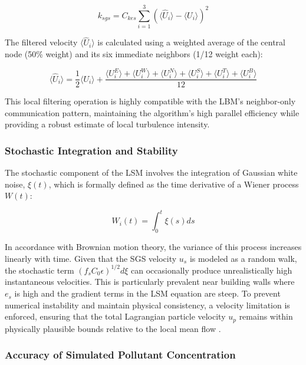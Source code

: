 \begin{equation}
    k_{sgs} = C_{kes} \sum_{i=1}^3 (\langle \hat{U}_i \rangle - \langle U_i \rangle)^2    
\end{equation}


The filtered velocity $\langle \hat{U}_i \rangle$ is calculated using a weighted average of the central node (50\% weight) and its six immediate neighbors (1/12 weight each):

\begin{equation}
    \langle \hat{U}_i \rangle = \frac{1}{2}\langle U_i \rangle + \frac{\langle U_i^E \rangle + \langle U_i^W \rangle + \langle U_i^N \rangle + \langle U_i^S \rangle + \langle U_i^T \rangle + \langle U_i^B \rangle}{12}    
\end{equation}

This local filtering operation is highly compatible with the LBM's neighbor-only communication pattern, maintaining the algorithm's high parallel efficiency while providing a robust estimate of local turbulence intensity.

\subsubsection{Stochastic Integration and Stability}
The stochastic component of the LSM involves the integration of Gaussian white noise, $\xi(t)$, which is formally defined as the time derivative of a Wiener process $W(t)$:

\begin{equation}
    W_i(t) = \int_0^t \xi(s) ds    
\end{equation}

In accordance with Brownian motion theory, the variance of this process increases linearly with time. Given that the SGS velocity $u_s$ is modeled as a random walk, the stochastic term $(f_s C_0 \epsilon)^{1/2} d\xi$ can occasionally produce unrealistically high instantaneous velocities. This is particularly prevalent near building walls where $e_s$ is high and the gradient terms in the LSM equation are steep. To prevent numerical instability and maintain physical consistency, a velocity limitation is enforced, ensuring that the total Lagrangian particle velocity $u_p$ remains within physically plausible bounds relative to the local mean flow \cite{Yokouchi2020Simulation}.

\subsubsection{Accuracy of Simulated Pollutant Concentration}

